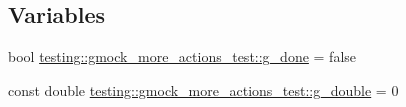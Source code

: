 \subsection*{Variables}
\begin{DoxyCompactItemize}
\item 
bool \hyperlink{namespacetesting_1_1gmock__more__actions__test_ab2d168581c62c89bd00cdadcccd9e8e4}{testing\+::gmock\+\_\+more\+\_\+actions\+\_\+test\+::g\+\_\+done} = false
\item 
const double \hyperlink{namespacetesting_1_1gmock__more__actions__test_a73552112032ff5d5900dd6f128a62718}{testing\+::gmock\+\_\+more\+\_\+actions\+\_\+test\+::g\+\_\+double} = 0
\end{DoxyCompactItemize}
